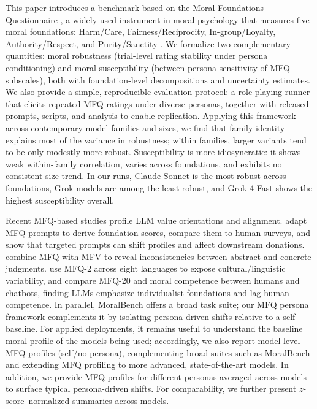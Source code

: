 \documentclass{article}
\begin{document}
This paper introduces a benchmark based on the Moral Foundations Questionnaire \citep{moralfoundations2017questionnaires}, a widely used instrument in moral psychology that measures five moral foundations: Harm/Care, Fairness/Reciprocity, In-group/Loyalty, Authority/Respect, and Purity/Sanctity \citep{graham2009liberals,haidt2007when,moralfoundations2017questionnaires}. We formalize two complementary quantities: moral robustness (trial-level rating stability under persona conditioning) and moral susceptibility (between-persona sensitivity of MFQ subscales), both with foundation-level decompositions and uncertainty estimates. We also provide a simple, reproducible evaluation protocol: a role-playing runner that elicits repeated MFQ ratings under diverse personas, together with released prompts, scripts, and analysis to enable replication. Applying this framework across contemporary model families and sizes, we find that family identity explains most of the variance in robustness; within families, larger variants tend to be only modestly more robust. Susceptibility is more idiosyncratic: it shows weak within-family correlation, varies across foundations, and exhibits no consistent size trend. In our runs, Claude Sonnet is the most robust across foundations, Grok models are among the least robust, and Grok 4 Fast shows the highest susceptibility overall.

Recent MFQ-based studies profile LLM value orientations and alignment. \citet{abdulhai-etal-2024-moral} adapt MFQ prompts to derive foundation scores, compare them to human surveys, and show that targeted prompts can shift profiles and affect downstream donations. \citet{nunes2024hypocrites} combine MFQ with MFV to reveal inconsistencies between abstract and concrete judgments. \citet{aksoy2024whose} use MFQ-2 across eight languages to expose cultural/linguistic variability, and \citet{bajpai2024insights} compare MFQ-20 and moral competence between humans and chatbots, finding LLMs emphasize individualist foundations and lag human competence. In parallel, MoralBench \citep{ji2025moralbenchmoralevaluationllms} offers a broad task suite; our MFQ persona framework complements it by isolating persona-driven shifts relative to a self baseline. For applied deployments, it remains useful to understand the baseline moral profile of the models being used; accordingly, we also report model-level MFQ profiles (self/no-persona), complementing broad suites such as MoralBench and extending MFQ profiling to more advanced, state-of-the-art models. In addition, we provide MFQ profiles for different personas averaged across models to surface typical persona-driven shifts. For comparability, we further present $z$-score–normalized summaries across models.
\end{document}
